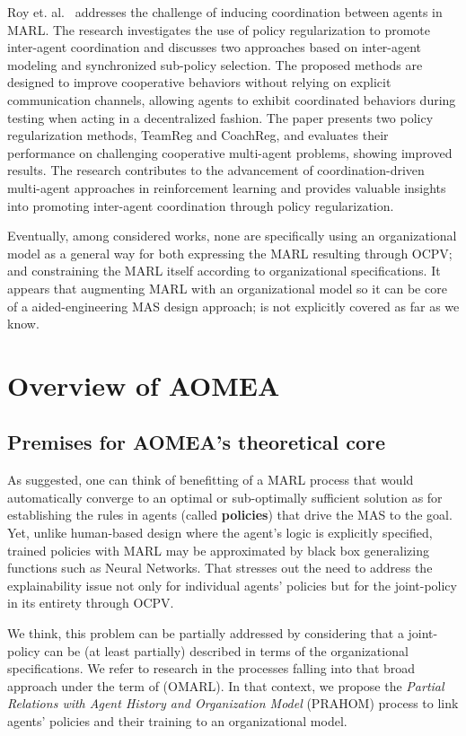 \documentclass[runningheads]{llncs}
\begin{document}
Roy et. al.~\cite{Roy2020} addresses the challenge of inducing coordination between agents in MARL. The research investigates the use of policy regularization to promote inter-agent coordination and discusses two approaches based on inter-agent modeling and synchronized sub-policy selection. The proposed methods are designed to improve cooperative behaviors without relying on explicit communication channels, allowing agents to exhibit coordinated behaviors during testing when acting in a decentralized fashion. The paper presents two policy regularization methods, TeamReg and CoachReg, and evaluates their performance on challenging cooperative multi-agent problems, showing improved results. The research contributes to the advancement of coordination-driven multi-agent approaches in reinforcement learning and provides valuable insights into promoting inter-agent coordination through policy regularization.

Eventually, among considered works, none are specifically using an organizational model as a general way for both expressing the MARL resulting through OCPV; and constraining the MARL itself according to organizational specifications. It appears that augmenting MARL with an organizational model so it can be core of a aided-engineering MAS design approach; is not explicitly covered as far as we know.

\section{Overview of AOMEA}

\subsection{Premises for AOMEA's theoretical core}

As suggested, one can think of benefitting of a MARL process that would automatically converge to an optimal or sub-optimally sufficient solution as for establishing the rules in agents (called \textbf{policies}) that drive the MAS to the goal. Yet, unlike human-based design where the agent's logic is explicitly specified, trained policies with MARL may be approximated by black box generalizing functions such as Neural Networks. That stresses out the need to address the explainability issue not only for individual agents' policies but for the joint-policy in its entirety through OCPV.

We think, this problem can be partially addressed by considering that a joint-policy can be (at least partially) described in terms of the organizational specifications.
We refer to research in the processes falling into that broad approach under the term of  (OMARL).
In that context, we propose the \emph{Partial Relations with Agent History and Organization Model} (PRAHOM) process to link agents' policies and their training to an organizational model.
\end{document}
